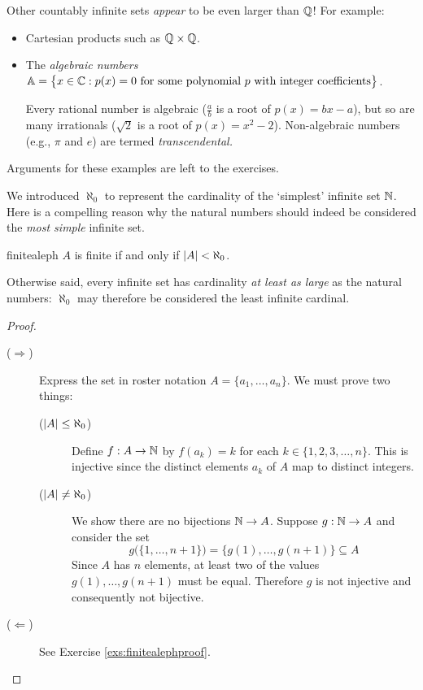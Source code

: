\goodbreak


Other countably infinite sets \emph{appear} to be even larger than $\mathbb{Q}$! For example:
\begin{itemize}
  \item Cartesian products such as $\mathbb{Q}\times\mathbb{Q}$.
  \item The \emph{algebraic numbers} $\mathbb{A}=\bigl\{x\in\mathbb{C}:p(x)=0\text{ for some polynomial $p$ with integer coefficients}\bigr\}$.\par
  Every rational number is algebraic ($\frac ab$ is a root of $p(x)=bx-a$), but so are many irrationals ($\sqrt 2$ is a root of $p(x)=x^2-2$). Non-algebraic numbers (e.g., $\pi$ and $e$) are termed \emph{transcendental.}
\end{itemize}

Arguments for these examples are left to the exercises.



We introduced $\aleph_0$ to represent the cardinality of the `simplest' infinite set $\mathbb{N}$. Here is a compelling reason why the natural numbers should indeed be considered the \emph{most simple} infinite set.

\begin{thm}{}{finitealeph}
	$A$ is finite if and only if $\left| A\right|<\aleph_0$.
\end{thm}

Otherwise said, every infinite set has cardinality \emph{at least as large} as the natural numbers: $\aleph_0$ may therefore be considered the least infinite cardinal.

\begin{proof}
	\begin{description}
		\item[\normalfont ($\Rightarrow$)]
		Express the set in roster notation $A=\{a_1,\ldots,a_n\}$. We must prove two things:\footnotemark{}
		\begin{description}
			\item[\normalfont($\left| A\right|\le\aleph_0$)] Define $f:A\to\mathbb{N}$ by $f(a_k)=k$ for each $k\in\{1,2,3,\ldots,n\}$. This is injective since the distinct elements $a_k$ of $A$ map to distinct integers.
			\item[\normalfont($\left| A\right|\neq\aleph_0$)] We show there are no bijections $\mathbb{N}\to A$. Suppose $g:\mathbb{N}\to A$ and consider the set
			\[
				g\bigl(\{1,\ldots,n+1\}\bigr)=\bigl\{g(1),\ldots,g(n+1)\bigr\}\subseteq A
			\]
			Since $A$ has $n$ elements, at least two of the values $g(1),\ldots,g(n+1)$ must be equal. Therefore $g$ is not injective and consequently not bijective.
		\end{description}
		\item[\normalfont ($\Leftarrow$)] See Exercise \ref{exs:finitealephproof}. \qedhere
	\end{description} 
\end{proof}

